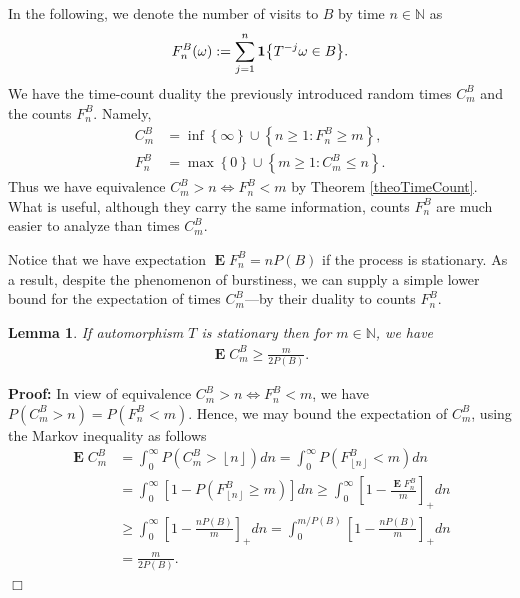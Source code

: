 \documentclass[a4paper,12pt]{article}
\newcommand{\kwad}[1]{\left[ #1 \right]}
\newcommand{\klam}[1]{\left\{ #1 \right\}}
\newcommand{\floor}[1]{\left\lfloor #1 \right\rfloor}
\DeclareMathOperator{\mean}{\mathbf{E}}
\newcommand{\boole}[1]{{\bf 1}{\klam{#1}}}
\newtheorem{lemma}{Lemma}
\newenvironment*{proof}{\begin{trivlist}\item[]
\noindent\textbf{Proof:}}{$\Box$\par\end{trivlist}}
\begin{document}
In the following, we denote
the number of visits to $B$ by time $n\in\mathbb{N}$ as
\begin{align}
  F^B_n(\omega):=\sum_{j=1}^n \boole{T^{-j}\omega\in B}.
\end{align}
We have the time-count duality the previously introduced random times
$C^B_m$ and the counts $F^B_n$. Namely,
\begin{align}
  C^B_m&=\inf\klam{\infty}\cup\klam{n\ge 1: F^B_n\ge m},
  \\
  F^B_n&=\max\klam{0}\cup\klam{m\ge 1: C^B_m\le n}.
\end{align}
Thus we have equivalence $C^B_m>n\iff F^B_n<m$ by Theorem
\ref{theoTimeCount}.  What is useful, although they carry the same
information, counts $F^B_n$ are much easier to analyze than times
$C^B_m$.

Notice that we have expectation $\mean F^B_n=nP(B)$ if the process is
stationary. As a result, despite the phenomenon of burstiness, we can
supply a simple lower bound for the expectation of times $C^B_m$---by
their duality to counts $F^B_n$.
\begin{lemma}
  \label{theoUnconditional}
  If automorphism $T$ is stationary then for $m\in\mathbb{N}$, we have
  \begin{align}
    \mean C^B_m
    \ge
    \frac{m}{2P(B)}.
  \end{align}
\end{lemma}
\begin{proof}
  In view of equivalence $C^B_m>n\iff F^B_n<m$, we have
  $P(C^B_m>n)=P(F^B_n<m)$.  Hence, we may bound the expectation of
  $C^B_m$, using the Markov inequality as follows
  \begin{align}
    \mean C^B_m
    &=
    \int_0^\infty P(C^B_m>\floor{n}) dn
    =
    \int_0^\infty P(F^B_{\floor{n}}<m) dn
      \nonumber\\
    &=
      \int_0^\infty \kwad{1-P(F^B_{\floor{n}}\ge m)} dn
      \ge
      \int_0^\infty \kwad{1-\frac{\mean F^B_n}{m}}_+ dn
      \nonumber\\
    &\ge
      \int_0^\infty \kwad{1-\frac{nP(B)}{m}}_+ dn
      =
      \int_0^{m/P(B)} \kwad{1-\frac{nP(B)}{m}}_+ dn
      \nonumber\\
    &=
      \frac{m}{2P(B)}.
  \end{align}
\end{proof}
\end{document}
